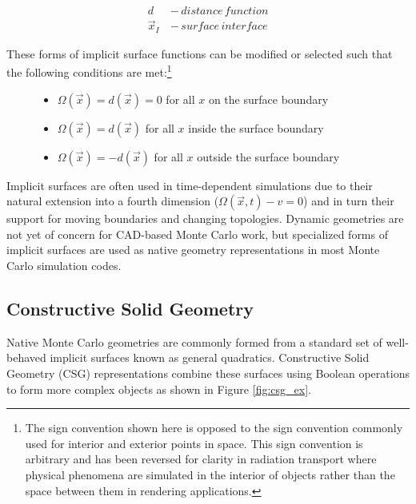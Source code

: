 \begin{align}
  d \, &- \, distance \, function \\
  \vec{x}_{I} \, &- \,surface \, interface
\end{align}

\noindent

\setcounter{footnote}{1}
These forms of implicit surface functions can be modified or selected such that the following
conditions are met:\footnote{The sign convention shown here is opposed to the
  sign convention commonly used for interior and exterior points in space. This
  sign convention is arbitrary and has been reversed for clarity in radiation
  transport where physical phenomena are simulated in the interior of objects
  rather than the space between them in rendering applications.}

\begin{figure}[H]
  \begin{center}
      \begin{itemize}
      \item $ \Omega(\vec{x}) = d(\vec{x}) = 0 $ for all $x$ on the surface boundary
      \item $ \Omega(\vec{x}) = d(\vec{x}) $ for all $x$ inside the surface boundary
      \item $ \Omega(\vec{x}) = -d(\vec{x}) $ for all $x$ outside the surface boundary
      \end{itemize}
  \end{center}
\end{figure}

Implicit surfaces are often used in time-dependent simulations due to their
natural extension into a fourth dimension ($ \Omega(\vec{x},t) - v  = 0 $) and
in turn their support for moving boundaries and changing topologies. Dynamic
geometries are not yet of concern for CAD-based Monte Carlo work, but
specialized forms of implicit surfaces are used as native geometry
representations in most Monte Carlo simulation codes.

\subsection{Constructive Solid Geometry}\label{subsec:csg}

Native Monte Carlo geometries are commonly formed from a standard set of
well-behaved implicit surfaces known as general quadratics. Constructive Solid
Geometry (CSG) representations combine these surfaces using Boolean operations to
form more complex objects as shown in Figure \ref{fig:csg_ex}.

